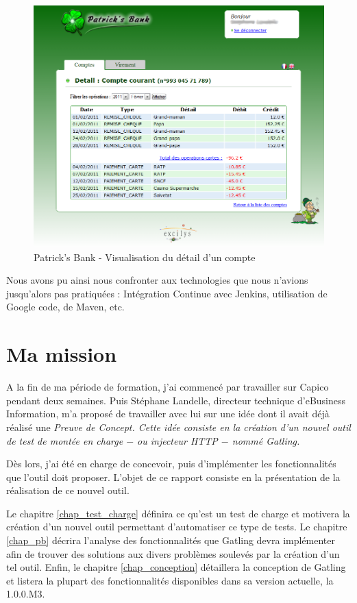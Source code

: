 \begin{figure}[h]
\begin{center}
\includegraphics[width=400pt]{img/patricks_bank.png}
\end{center}
\caption{Patrick's Bank - Visualisation du détail d'un compte}
\label{patricks_bank}
\end{figure}

Nous avons pu ainsi nous confronter aux technologies que nous n'avions jusqu'alors pas pratiquées : Intégration Continue avec Jenkins, utilisation de Google code, de Maven, etc.

\section{Ma mission}
A la fin de ma période de formation, j'ai commencé par travailler sur Capico pendant deux semaines. Puis Stéphane Landelle, directeur technique d'eBusiness Information, m'a proposé de travailler avec lui sur une idée dont il avait déjà réalisé une \em{Preuve de Concept}. Cette idée consiste en la création d'un nouvel outil de test de montée en charge $-$ ou injecteur HTTP $-$ nommé Gatling\cite{www_gatling}.

Dès lors, j'ai été en charge de concevoir, puis d'implémenter les fonctionnalités que l'outil doit proposer. L'objet de ce rapport consiste en la présentation de la réalisation de ce nouvel outil.

Le chapitre \ref{chap_test_charge} définira ce qu'est un test de charge et motivera la création d'un nouvel outil permettant d'automatiser ce type de tests. Le chapitre \ref{chap_pb} décrira l'analyse des fonctionnalités que Gatling devra implémenter afin de trouver des solutions aux divers problèmes soulevés par la création d'un tel outil. Enfin, le chapitre \ref{chap_conception} détaillera la conception de Gatling et listera la plupart des fonctionnalités disponibles dans sa version actuelle, la 1.0.0.M3.